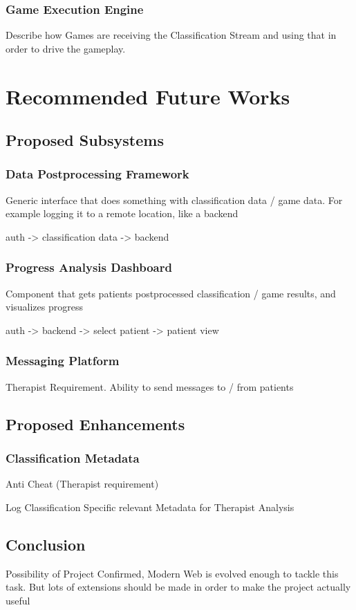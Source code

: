 \documentclass[fontsize=12pt,a4paper,draft]{scrartcl}[2018/05/07]
\begin{document}
\subsubsection{Game Execution Engine}
Describe how Games are receiving the Classification Stream and using that in order to drive the gameplay.
\section{Recommended Future Works}
\subsection{Proposed Subsystems}
\subsubsection{Data Postprocessing Framework}
Generic interface that does something with classification data / game data. For example logging it to a remote location, like a backend

auth -> classification data -> backend
\subsubsection{Progress Analysis Dashboard}
Component that gets patients postprocessed classification / game results, and visualizes progress

auth -> backend -> select patient -> patient view
\subsubsection{Messaging Platform}
Therapist Requirement. Ability to send messages to / from patients
\subsection{Proposed Enhancements}
\subsubsection{Classification Metadata}
Anti Cheat (Therapist requirement)

Log Classification Specific relevant Metadata for Therapist Analysis

\subsection{Conclusion}
Possibility of Project Confirmed, Modern Web is evolved enough to tackle this task. But lots of extensions should be made in order to make the project actually useful
\end{document}
